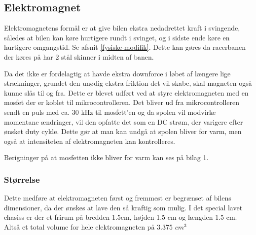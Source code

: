 
\subsection{Elektromagnet}
\label{Elektromagnet}


Elektromagnetens formål er at give bilen ekstra nedadrettet kraft i svingende, således at bilen kan køre hurtigere rundt i svinget, og i sidste ende køre en hurtigere omgangstid. Se afsnit \ref{fysiske-modifik}. Dette kan gøres da racerbanen der køres på har 2 stål skinner i midten af banen.

Da det ikke er fordelagtig at havde ekstra downforce i løbet af længere lige strækninger, grundet den unødig ekstra friktion det vil skabe, skal magneten også kunne slås til og fra. Dette er blevet udført ved at styre elektromagneten med en mosfet der er koblet til mikrocontrolleren. Det bliver ud fra mikrocontrolleren sendt en puls med ca. 30 kHz til mosfett’en og da spolen vil modvirke momentane ændringer, vil den opfatte det som en DC strøm, der varigere efter ønsket duty cykle. Dette gør at man kan undgå at spolen bliver for varm, men også at intensiteten af elektromagneten kan kontrolleres.

Berigninger på at mosfetten ikke bliver for varm kan ses på bilag 1.

\subsubsection{Størrelse}

Dette medføre at elektromagneten først og fremmest er begrænset af bilens dimensioner, da der ønskes at lave den så kraftig som mulig. I det special lavet chasiss er der et frirum på bredden 1.5cm, højden 1.5 cm og længden 1.5 cm. Altså et total volume for hele elektromagneten på 3.375 $cm^3$

